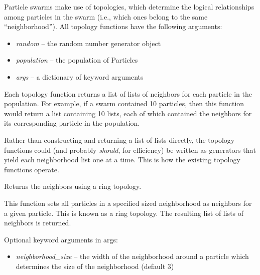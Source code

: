 \documentclass[letterpaper,10pt,english]{sphinxmanual}
\begin{document}
Particle swarms make use of topologies, which determine the logical
relationships among particles in the swarm (i.e., which ones belong to the same
``neighborhood''). All topology functions have the following arguments:
\begin{itemize}
\item {} 
\emph{random} -- the random number generator object

\item {} 
\emph{population} -- the population of Particles

\item {} 
\emph{args} -- a dictionary of keyword arguments

\end{itemize}

Each topology function returns a list of lists of neighbors
for each particle in the population. For example, if a swarm
contained 10 particles, then this function would return a list
containing 10 lists, each of which contained the neighbors for 
its corresponding particle in the population.

Rather than constructing and returning a list of lists directly, the 
topology functions could (and probably \emph{should}, for efficiency) be 
written as generators that yield each neighborhood list one at a 
time. This is how the existing topology functions operate.
\label{reference:module-topologies}

\begin{fulllineitems}
\label{reference:inspyred.swarm.topologies.ring_topology}
Returns the neighbors using a ring topology.

This function sets all particles in a specified sized neighborhood
as neighbors for a given particle. This is known as a ring 
topology. The resulting list of lists of neighbors is returned.

Optional keyword arguments in args:
\begin{itemize}
\item {} 
\emph{neighborhood\_size} -- the width of the neighborhood around a 
particle which determines the size of the neighborhood
(default 3)

\end{itemize}

\end{fulllineitems}
\end{document}

